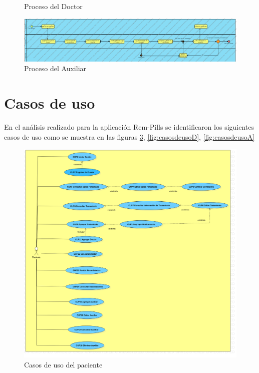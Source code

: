 \begin{landscape}
\begin{figure}[htb]
	\caption{Proceso del Doctor} \label{fig:proceso3}
\end{figure}
\newpage
\begin{figure}[htb]
	\centering
	\includegraphics[width=1.5\textwidth]{images/cap2/ProcesosAuxiliar}
	\caption{Proceso del Auxiliar} \label{fig:proceso4}
\end{figure}

\end{landscape}



\section{Casos de uso}
En el análisis realizado para la aplicación Rem-Pills se identificaron los siguientes casos de uso como se muestra en las figuras \ref{fig:casosdeuso}, \ref{fig:casosdeusoD}, \ref{fig:casosdeusoA}\\

\begin{figure}[htb]
	\centering
	\includegraphics[width=1.1\textwidth]{images/cap2/DCUPaciente2}
	\caption{Casos de uso del paciente} \label{fig:casosdeuso}
\end{figure}

